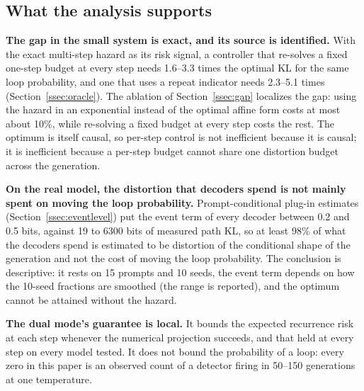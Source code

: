 \documentclass[11pt]{article}
\begin{document}
\subsection{What the analysis supports}
\textbf{The gap in the small system is exact, and its source is identified.} With the exact multi-step hazard as its risk signal, a controller that re-solves a fixed one-step budget at every step needs 1.6--3.3 times the optimal KL for the same loop probability, and one that uses a repeat indicator needs 2.3--5.1 times (Section~\ref{ssec:oracle}). The ablation of Section~\ref{ssec:gap} localizes the gap: using the hazard in an exponential instead of the optimal affine form costs at most about 10\%, while re-solving a fixed budget at every step costs the rest. The optimum is itself causal, so per-step control is not inefficient because it is causal; it is inefficient because a per-step budget cannot share one distortion budget across the generation.

\textbf{On the real model, the distortion that decoders spend is not mainly spent on moving the loop probability.} Prompt-conditional plug-in estimates (Section~\ref{ssec:eventlevel}) put the event term of every decoder between 0.2 and 0.5 bits, against 19 to 6300 bits of measured path KL, so at least 98\% of what the decoders spend is estimated to be distortion of the conditional shape of the generation and not the cost of moving the loop probability. The conclusion is descriptive: it rests on 15 prompts and 10 seeds, the event term depends on how the 10-seed fractions are smoothed (the range is reported), and the optimum cannot be attained without the hazard.

\textbf{The dual mode's guarantee is local.} It bounds the expected recurrence risk at each step whenever the numerical projection succeeds, and that held at every step on every model tested. It does not bound the probability of a loop: every zero in this paper is an observed count of a detector firing in 50--150 generations at one temperature.
\end{document}

